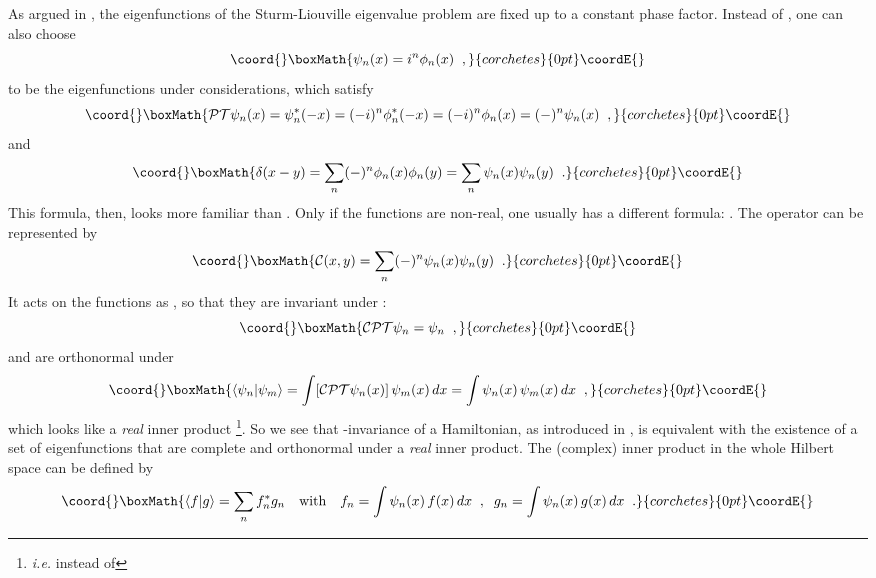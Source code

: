 \documentclass[a4paper,12pt]{article}
\providecommand{\PP}{\mathcal{P}}
\providecommand{\TT}{\mathcal{T}}
\providecommand{\CC}{\mathcal{C}}
\begin{document}
As argued in \cite{paper}, the eigenfunctions \coordHE{} of the Sturm-Liouville
eigenvalue problem \coordHE{} are fixed up to a constant phase factor.  
Instead of \coordHE{}, one can also choose
\begin{displaymath}\coord{}\boxMath{
   \psi_n(x) = i^n\phi_n(x)
\;\;,
}{corchetes}{0pt}\coordE{}\end{displaymath}
to be the eigenfunctions under considerations, which satisfy 
\begin{displaymath}\coord{}\boxMath{
   \PP\TT\psi_n(x) = \psi_n^*(-x) = (-i)^n\phi_n^*(-x) 
                   = (-i)^n\phi_n(x) = (-)^n\psi_n(x)
\;\;,
}{corchetes}{0pt}\coordE{}\end{displaymath}
and 
\begin{displaymath}\coord{}\boxMath{
   \delta(x-y) = \sum_n(-)^n\phi_n(x)\phi_n(y) = \sum_n\psi_n(x)\psi_n(y)
\;\;.
}{corchetes}{0pt}\coordE{}\end{displaymath}
This formula, then, looks more familiar than \coordHE{}. Only if the functions
\coordHE{} are non-real, one usually has a different formula:
\coordHE{}.
The operator \myHighlight{$\CC$}\coordHE{} can be represented by
\begin{displaymath}\coord{}\boxMath{
   \CC(x,y) = \sum_n(-)^n\psi_n(x)\psi_n(y)
\;\;.
}{corchetes}{0pt}\coordE{}\end{displaymath}
It acts on the functions \coordHE{} as \myHighlight{$\CC\psi_n=(-)^n\psi_n$}\coordHE{}, so that they
are invariant under \myHighlight{$\CC\PP\TT$}\coordHE{}:
\begin{displaymath}\coord{}\boxMath{
   \CC\PP\TT\psi_n = \psi_n
\;\;,
}{corchetes}{0pt}\coordE{}\end{displaymath}
and are orthonormal under
\begin{displaymath}\coord{}\boxMath{
   \langle \psi_n|\psi_m \rangle
   = \int[\CC\PP\TT\psi_n(x)]\,\psi_m(x)\,dx
   = \int\psi_n(x)\,\psi_m(x)\,dx
\;\;,
}{corchetes}{0pt}\coordE{}\end{displaymath}
which looks like a {\em real\/} inner product%
\footnote{{\it i.e.\/} \coordHE{} instead of 
\coordHE{}}. 
So we see that \myHighlight{$\CC\PP\TT$}\coordHE{}-invariance of a Hamiltonian, as introduced in \cite{paper},
is equivalent with the
existence of a set of eigenfunctions that are complete and orthonormal under a
{\em real\/} inner product.  The (complex) inner product in the whole Hilbert
space can be defined by
\begin{displaymath}\coord{}\boxMath{
   \langle f|g\rangle = \sum_nf_n^*g_n
   \quad\textrm{with}\quad
   f_n = \int\psi_n(x)\,f(x)\,dx
   \;\;,\;\;
   g_n = \int\psi_n(x)\,g(x)\,dx
\;\;.
}{corchetes}{0pt}\coordE{}\end{displaymath}
\end{document}
